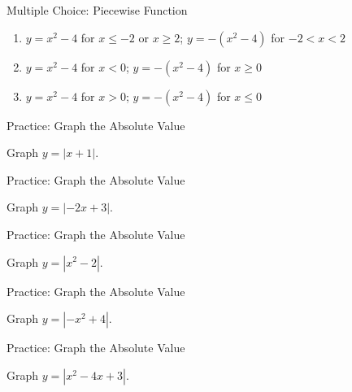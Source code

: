 \documentclass[aspectratio=169]{beamer}
\begin{document}
\begin{frame}{Multiple Choice: Piecewise Function}
    \begin{tcolorbox}[colback=lightgray,colframe=primary,title=Which is the correct piecewise function for $y=|x^2-4|$?]
        \footnotesize
        \begin{enumerate}
            \item $y = x^2-4$ for $x \leq -2$ or $x \geq 2$; $y = -(x^2-4)$ for $-2 < x < 2$
            \item $y = x^2-4$ for $x < 0$; $y = -(x^2-4)$ for $x \geq 0$
            \item $y = x^2-4$ for $x > 0$; $y = -(x^2-4)$ for $x \leq 0$
        \end{enumerate}
    \end{tcolorbox}
\end{frame}

\begin{frame}{Practice: Graph the Absolute Value}
    \begin{tcolorbox}[colback=lightgray,colframe=accent,title=Practice 1]
        \footnotesize
        Graph $y = |x + 1|$.
    \end{tcolorbox}
\end{frame}

\begin{frame}{Practice: Graph the Absolute Value}
    \begin{tcolorbox}[colback=lightgray,colframe=accent,title=Practice 2]
        \footnotesize
        Graph $y = |-2x + 3|$.
    \end{tcolorbox}
\end{frame}

\begin{frame}{Practice: Graph the Absolute Value}
    \begin{tcolorbox}[colback=lightgray,colframe=accent,title=Practice 3]
        \footnotesize
        Graph $y = |x^2 - 2|$.
    \end{tcolorbox}
\end{frame}

\begin{frame}{Practice: Graph the Absolute Value}
    \begin{tcolorbox}[colback=lightgray,colframe=accent,title=Practice 4]
        \footnotesize
        Graph $y = |-x^2 + 4|$.
    \end{tcolorbox}
\end{frame}

\begin{frame}{Practice: Graph the Absolute Value}
    \begin{tcolorbox}[colback=lightgray,colframe=accent,title=Practice 5]
        \footnotesize
        Graph $y = |x^2 - 4x + 3|$.
    \end{tcolorbox}
\end{frame}
\end{document}
